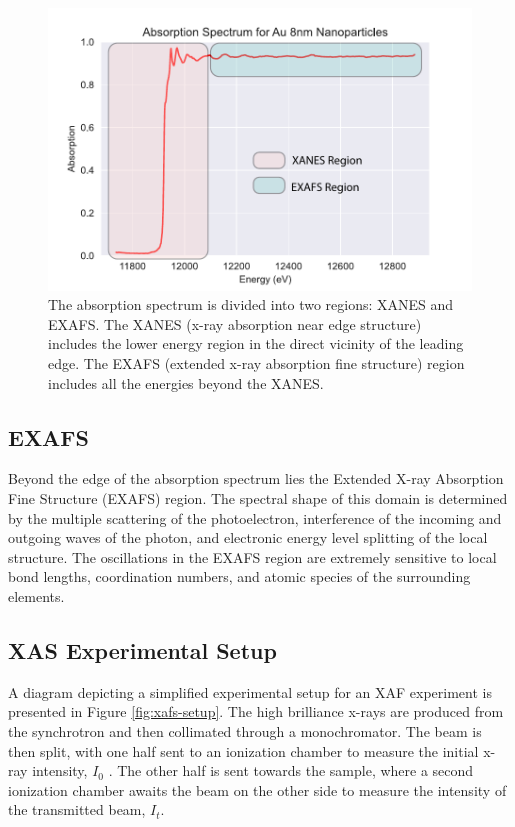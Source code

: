 \begin{figure}
    \centering
    \includegraphics[width=\linewidth]{Chapters/Figures/absorption-spectra-example.pdf}
    \caption{The absorption spectrum is divided into two regions: XANES and EXAFS. The XANES (x-ray absorption near edge structure) includes the lower energy region in the direct vicinity of the leading edge. The EXAFS (extended x-ray absorption fine structure) region includes all the energies beyond the XANES.}
\end{figure}

\subsection{EXAFS}
Beyond the edge of the absorption spectrum lies the Extended X-ray Absorption Fine Structure (EXAFS) region. The spectral shape of this domain is determined by the multiple scattering of the photoelectron, interference of the incoming and outgoing waves of the photon, and electronic energy level splitting of the local structure. The oscillations in the EXAFS region are extremely sensitive to local bond lengths, coordination numbers, and atomic species of the surrounding elements.

\subsection{XAS Experimental Setup}
A diagram depicting a simplified experimental setup for an XAF experiment is presented in Figure \ref{fig:xafs-setup}. The high brilliance x-rays are produced from the synchrotron and then collimated through a monochromator. The beam is then split, with one half sent to an ionization chamber to measure the initial x-ray intensity, $ I_0 $ . The other half is sent towards the sample, where a second ionization chamber awaits the beam on the other side to measure the intensity of the transmitted beam, $ I_t $.  

